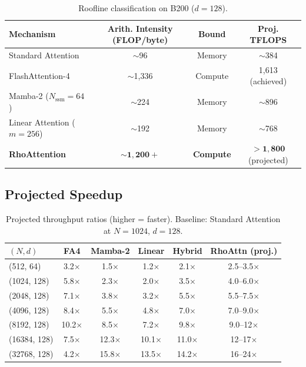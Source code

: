 \documentclass[11pt,a4paper]{article}
\theoremstyle{remark}
\begin{document}
\begin{table}[h]
\centering
\caption{Roofline classification on B200 ($d=128$).}
\begin{tabular}{lccc}
\toprule
\textbf{Mechanism} & \textbf{Arith. Intensity (FLOP/byte)} & \textbf{Bound} & \textbf{Proj. TFLOPS} \\
\midrule
Standard Attention & $\sim$96 & Memory & $\sim$384 \\
FlashAttention-4 & $\sim$1,336 & Compute & 1,613 (achieved) \\
Mamba-2 ($N_{\text{ssm}}=64$) & $\sim$224 & Memory & $\sim$896 \\
Linear Attention ($m=256$) & $\sim$192 & Memory & $\sim$768 \\
\textbf{RhoAttention} & $\mathbf{\sim 1,200+}$ & \textbf{Compute} & $\mathbf{>1,800}$ (projected) \\
\bottomrule
\end{tabular}
\end{table}

\subsection{Projected Speedup}

\begin{table}[h]
\centering
\caption{Projected throughput ratios (higher = faster). Baseline: Standard Attention at $N=1024$, $d=128$.}
\begin{tabular}{lccccc}
\toprule
\textbf{$(N, d)$} & \textbf{FA4} & \textbf{Mamba-2} & \textbf{Linear} & \textbf{Hybrid} & \textbf{RhoAttn (proj.)} \\
\midrule
(512, 64)   & 3.2$\times$ & 1.5$\times$ & 1.2$\times$ & 2.1$\times$ & 2.5--3.5$\times$ \\
(1024, 128) & 5.8$\times$ & 2.3$\times$ & 2.0$\times$ & 3.5$\times$ & 4.0--6.0$\times$ \\
(2048, 128) & 7.1$\times$ & 3.8$\times$ & 3.2$\times$ & 5.5$\times$ & 5.5--7.5$\times$ \\
(4096, 128) & 8.4$\times$ & 5.5$\times$ & 4.8$\times$ & 7.0$\times$ & 7.0--9.0$\times$ \\
(8192, 128) & 10.2$\times$ & 8.5$\times$ & 7.2$\times$ & 9.8$\times$ & 9.0--12$\times$ \\
(16384, 128) & 7.5$\times$ & 12.3$\times$ & 10.1$\times$ & 11.0$\times$ & 12--17$\times$ \\
(32768, 128) & 4.2$\times$ & 15.8$\times$ & 13.5$\times$ & 14.2$\times$ & 16--24$\times$ \\
\bottomrule
\end{tabular}
\end{table}
\end{document}
